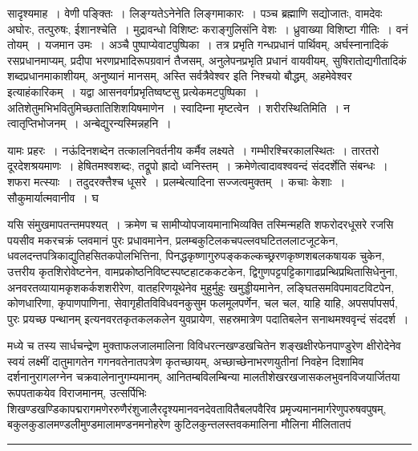 \documentclass[11pt, openany]{book}
\begin{document}
\noindent
{\s सादृश्यमाह~। वेणी पङ्क्तिः~। लिङ्ग्यतेऽनेनेति लिङ्गमाकारः~। पञ्च ब्रह्माणि सद्योजातः, वामदेवः अघोरः, तत्पुरुषः, ईशानश्चेति~। मुद्रावन्धो विशिष्टः कराङ्गुलिसंनि वेशः~। ध्रुवाख्या विशिष्टा गीतिः~। वनं तोयम्~। यजमान उमः~। अञ्चै पुष्पाप्येवाटपुष्पिका~। तत्र प्रभृति गन्धप्रधानं पार्थिवम्, अर्घस्नानादिकं रसप्रधानमाप्यम्, प्रदीपा भरणप्रभादिरूपग्रवानं तैजसम्, अनुलेपनप्रभृति प्रधानं वायवीयम्, सुषिरातोद्यगीतादिकं शब्दप्रधानमाकाशीयम्, अनुष्यानं मानसम्, अस्ति सर्वत्रैवेश्वर इति निश्चयो बौद्धम्, अहमेवेश्वर इत्याहंकारिकम्~। यद्वा आसनवर्गप्रभृतिष्वष्टसु प्रत्येकमटपुष्पिका~। अतिशेतुमभिभवितुमिच्छतातिशिशयिषमाणेन~। स्वादिम्ना मृष्टत्वेन~। {\qtt शरीरस्थितिमिति}~। न त्वातृप्तिभोजनम्~। अन्बेद्युरन्यस्मिन्नहनि~।

यामः प्रहरः~। नऊंदिनशब्देन तत्कालनिवर्तनीय कर्मैव लक्ष्यते~। गम्भीरश्चिरकालस्थितः~। तारतरो दूरदेशश्रयमाणः~। हेषितमश्वशब्दः, तद्रूपो ह्रादो ध्वनिस्तम्~। क्रमेणेत्वादावश्ववन्दं संददर्शेति संबन्धः~। शफरा मत्स्याः~। तदुदरक्त्तैश्च धूसरे~। प्रलम्बेत्यादिना सज्जत्वमुक्तम्~। कचाः केशाः~। सौकुमार्यात्मवानीव~। घ\textendash }

\newpage

\noindent
यसि संमुखमापतन्तमपश्यत्~। क्रमेण च सामीप्योपजायमानाभिव्यक्ति तस्मिन्महति शफरोदरधूसरे रजसि पयसीव मकरचक्रं प्लवमानं पुरः प्रधावमानेन, प्रलम्बकुटिलकचपल्लवघटितललाटजूटकेन, धवलदन्तपत्रिकाद्युतिहसितकपोलभित्तिना, पिनद्धकृष्णागुरुपङ्ककल्कच्छ्ररणकृष्णशबलकषायक चुकेन, उत्तरीय कृतशिरोवेष्टनेन, वामप्रकोष्ठनिविष्टस्पष्टहाटककटकेन, द्विगुणपट्टपट्टिकागाढप्रन्थिप्रथितासिधेनुना, अनवरतव्यायामकृशकर्कशशरीरेण, वातहरिणयूथेनेव मुहुर्मुहुः खमुड्डीयमानेन, लङ्घितसमविपमावटविटपेन, कोणधारिणा, कृपाणपाणिना, सेवागृहीतविविधवनकुसुम फलमूलपर्णेन, {\haq चल चल, याहि याहि, अपसर्पापसर्प, पुरः प्रयच्छ पन्थानम्} इत्यनवरतकृतकलकलेन युवप्रायेण, सहस्रमात्रेण पदातिबलेन सनाथमश्ववृन्दं संददर्श~।

मध्ये च तस्य सार्धचन्द्रेण मुक्ताफलजालमालिना विविधरत्नखण्डखचितेन शङ्खक्षीरफेनपाण्डुरेण क्षीरोदेनेव स्वयं लक्ष्मीं दातुमागतेन गगनवतेनातपत्रेण कृतच्छायम्, अच्छाच्छेनाभरणयुतीनां निवहेन दिशामिव दर्शनानुरागलग्नेन चक्रवालेनानुगम्यमानम्, आनितम्बविलम्बिन्या मालतीशेखरखजासकलभुवनविजयार्जितया रूपपताकयेव विराजमानम्, उत्सर्पिभिः शिखण्डखण्डिकापद्मरागमणेररुणैरंशुजालैरदृश्यमानवनदेवतावितैबलपवैरिव प्रमृज्यमानमार्गरेणुपरुषवपुषम्, बकुलकुडालमण्डलीमुण्डमालामण्डनमनोहरेण कुटिलकुन्तलस्तवकमालिना मौलिना मीलितातपं

\vspace{2mm}
\hrule
\end{document}

